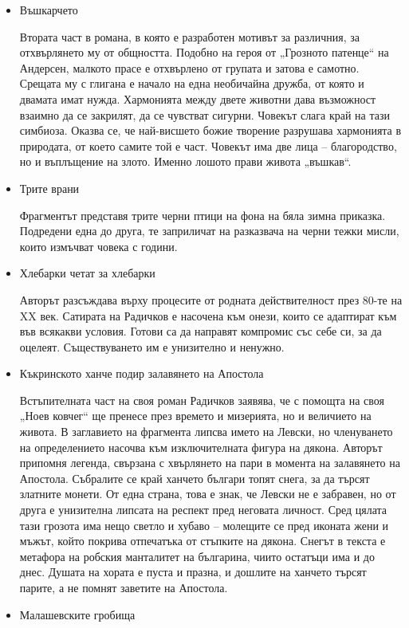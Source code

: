 \documentclass[12pt,a4paper]{article}
\begin{document}
\begin{itemize}
    \item Въшкарчето
     
    \hspace*{0.5cm} Втората част в романа, в която е разработен мотивът за различния, за отхвърлянето му от общността. Подобно на героя от „Грозното патенце“ на Андерсен, малкото прасе е отхвърлено от групата и затова е самотно. Срещата му с глигана е начало на една необичайна дружба, от която и двамата имат нужда. Хармонията между двете животни дава възможност взаимно да се закрилят, да се чувстват сигурни. Човекът слага край на тази симбиоза. Оказва се, че най-висшето божие творение разрушава хармонията в природата, от което самите той е част. Човекът има две лица – благородство, но и въплъщение на злото. Именно лошото прави живота „въшкав“.
    \vspace{-0.2cm}
    \item Трите врани
     
    \hspace*{0.5cm} Фрагментът представя трите черни птици на фона на бяла зимна приказка. Подредени една до друга, те заприличат на разказвача на черни тежки мисли, които измъчват човека с години.
    \vspace{-0.2cm}
    \item Хлебарки четат за хлебарки
     
    \hspace*{0.5cm} Авторът разсъждава върху процесите от родната действителност през 80-те на XX век. Сатирата на Радичков е насочена към онези, които се адаптират към във всякакви условия. Готови са да направят компромис със себе си, за да оцелеят. Съществуването им е унизително и ненужно.
    \vspace{-0.2cm}
    \item Къкринското ханче подир залавянето на Апостола
     
    \hspace*{0.5cm} Встъпителната част на своя роман Радичков заявява, че с помощта на своя „Ноев ковчег“ ще пренесе през времето и мизерията, но и величието на живота. В заглавието на фрагмента липсва името на Левски, но членуването на определението насочва към изключителната фигура на дякона. Авторът припомня легенда, свързана с хвърлянето на пари в момента на залавянето на Апостола. Събралите се край ханчето българи топят снега, за да търсят златните монети. От една страна, това е знак, че Левски не е забравен, но от друга е унизителна липсата на респект пред неговата личност. Сред цялата тази грозота има нещо светло и хубаво – молещите се пред иконата жени и мъжът, който покрива отпечатъка от стъпките на дякона. Снегът в текста е метафора на робския манталитет на българина, чиито остатъци има и до днес. Душата на хората е пуста и празна, и дошлите на ханчето търсят парите, а не помнят заветите на Апостола.
    \vspace{-0.2cm}
    \item Малашевските гробища
     

\end{itemize}
\end{document}
